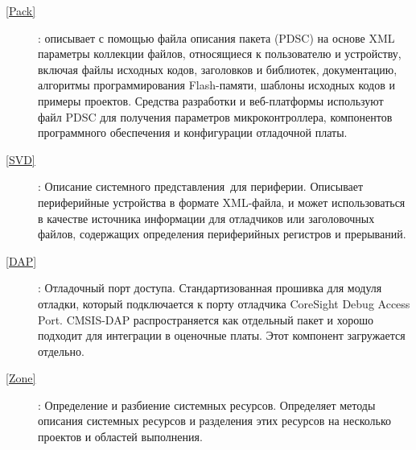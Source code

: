 \begin{description}
\item[ \ref{Pack}]: описывает с помощью файла описания пакета
(PDSC) на основе XML параметры коллекции файлов, относящиеся к пользователю и устройству,
включая файлы исходных кодов, заголовков и библиотек, документацию, алгоритмы
программирования Flash-памяти, шаблоны исходных кодов и при\-меры проектов.
Средства разработки и веб-платформы используют файл PDSC
для получения пара\-метров микроконтроллера, компонентов программного
обеспечения и конфигурации отладочной платы.

\item[ \ref{SVD}]: 
Описание системного представления\ для периферии.
Описывает периферийные устрой\-ства в формате XML-файла, и может использоваться
в качестве источника информации для отладчиков или заголовочных файлов, содержащих
определения периферийных регистров и прерываний.

\item[ \ref{DAP}]:
Отладочный порт доступа. Стандартизованная прошивка для
модуля отладки, который подключается к порту отладчика CoreSight Debug Access
Port. CMSIS-DAP распространяется как отдель\-ный пакет и хорошо подходит для
интеграции в оценочные платы. Этот компонент загружается отдельно.

\item[ \ref{Zone}]: Определение и разбиение системных ресурсов.
Определяет методы описания системных ресурсов и разделения этих ресурсов на
несколько проектов и областей выполнения.

\end{description}

